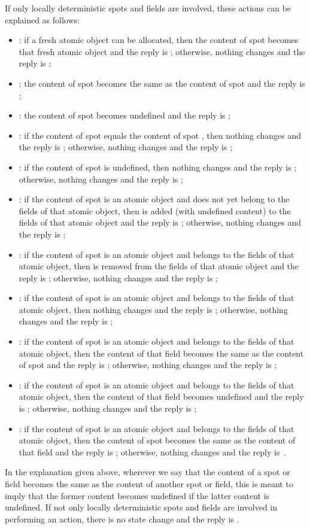\documentclass[fleqn]{llncs}
\begin{document}
If only locally deterministic spots and fields are involved, these
actions can be explained as follows:
\begin{itemize}
\item
:
if a fresh atomic object can be allocated, then the content of spot 
becomes that fresh atomic object and the reply is ; otherwise,
nothing changes and the reply is ;
\item
:
the content of spot  becomes the same as the content of spot 
and the reply is ;
\item
:
the content of spot  becomes undefined and the reply is ;
\item
:
if the content of spot  equals the content of spot , then
nothing changes and the reply is ; otherwise, nothing changes and
the reply is ;
\item
:
if the content of spot  is undefined, then nothing changes and the
reply is ; otherwise, nothing changes and the reply is ;
\item
:
if the content of spot  is an atomic object and  does not yet
belong to the fields of that atomic object, then  is added (with
undefined content) to the fields of that atomic object and the reply is
; otherwise, nothing changes and the reply is ;
\item
:
if the content of spot  is an atomic object and  belongs to the
fields of that atomic object, then  is removed from the fields of
that atomic object and the reply is ; otherwise, nothing changes
and the reply is ;
\item
:
if the content of spot  is an atomic object and  belongs to the
fields of that atomic object, then nothing changes and the reply is
; otherwise, nothing changes and the reply is ;
\item
:
if the content of spot  is an atomic object and  belongs to the
fields of that atomic object, then the content of that field becomes the
same as the content of spot  and the reply is ; otherwise,
nothing changes and the reply is ;
\item
:
if the content of spot  is an atomic object and  belongs to the
fields of that atomic object, then the content of that field becomes
undefined and the reply is ; otherwise, nothing changes and the
reply is ;
\item
:
if the content of spot  is an atomic object and  belongs to the
fields of that atomic object, then the content of spot  becomes the
same as the content of that field and the reply is ; otherwise,
nothing changes and the reply is~.
\end{itemize}
In the explanation given above, wherever we say that the content of a
spot or field becomes the same as the content of another spot or field,
this is meant to imply that the former content becomes undefined if the
latter content is undefined.
If not only locally deterministic spots and fields are involved in
performing an action, there is no state change and the reply is
.
\end{document}
